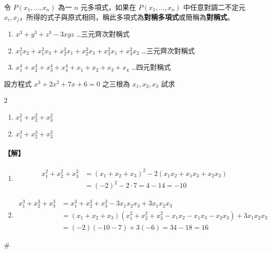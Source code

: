 \begin{definition}\label{def:b6s-2-symmetric}
令 $P(x_1, \dots, x_n)$ 為一 $n$ 元多項式，如果在 $P(x_1, \dots, x_n)$ 中任意對調二不定元 $x_i, x_j$，所得的式子與原式相同，稱此多項式為\textbf{對稱多項式}或簡稱為\textbf{對稱式}。
\end{definition}

\begin{example}\label{ex:b6s-2-10}
\begin{enumerate}[label=(\arabic*), leftmargin=2em]
  \item $x^3+y^3+z^3-3xyz$ \dots 三元齊次對稱式
  \item $x_1^2 x_2 + x_1^2 x_3 + x_2^2 x_1 + x_2^2 x_3 + x_3^2 x_1 + x_3^2 x_2$ \dots 三元齊次對稱式
  \item $x_1^4+x_2^4+x_3^4+x_4^4+x_1+x_2+x_3+x_4$ \dots 四元對稱式
\end{enumerate}
\end{example}

\begin{example}\label{ex:b6s-2-11}
設方程式 $x^3+2x^2+7x+6=0$ 之三根為 $x_1, x_2, x_3$ 試求
\begin{multicols}{2}
\begin{enumerate}[label=(\roman*)]
  \item $x_1^2+x_2^2+x_3^2$
  \item $x_1^3+x_2^3+x_3^3$
\end{enumerate}
\end{multicols}
\end{example}

\paragraph{【解】}
\begin{enumerate}[label=(\roman*), leftmargin=2em]
  \item
  \begin{align*}
  x_1^2+x_2^2+x_3^2 &= (x_1+x_2+x_3)^2 - 2(x_1 x_2 + x_1 x_3 + x_2 x_3) \\
  &= (-2)^2 - 2 \cdot 7 = 4 - 14 = -10
  \end{align*}
  \item
  \begin{align*}
  x_1^3+x_2^3+x_3^3 &= x_1^3+x_2^3+x_3^3-3x_1 x_2 x_3 + 3x_1 x_2 x_3 \\
  &= (x_1+x_2+x_3)(x_1^2+x_2^2+x_3^2 - x_1 x_2 - x_1 x_3 - x_2 x_3) + 3x_1 x_2 x_3 \\
  &= (-2)(-10-7) + 3(-6) = 34 - 18 = 16
  \end{align*}
\end{enumerate}
\hfill$\#$


